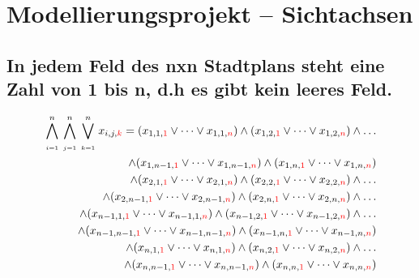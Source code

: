 \documentclass[11pt, a4paper]{article}
\begin{document}
	
	\setlength{\arrayrulewidth}{1pt} %
	
	\section{Modellierungsprojekt – Sichtachsen}
	\subsection{In jedem Feld des nxn Stadtplans steht eine Zahl von 1 bis n, d.h es gibt kein leeres Feld.}
	\begin{align*}
		\bigwedge_{\atop i=1}^n \bigwedge_{\atop j=1}^n \bigvee_{\atop k=1}^n
		x_{i,j,{\color{red}k}} = (x_{1,1,{\color{red} 1}} \vee \dots \vee x_{1,1,{\color{red} n}}) 
		\wedge (x_{1,2,{\color{red} 1}} \vee \dots \vee x_{1,2,{\color{red} n}})
		\wedge \dots \\
		\wedge (x_{1,n-1,{\color{red} 1}} \vee \dots \vee x_{1,n-1,{\color{red} n}})
		\wedge (x_{1,n,{\color{red} 1}} \vee \dots \vee x_{1,n,{\color{red} n}}) \\
		\wedge (x_{2,1,{\color{red} 1}} \vee \dots \vee x_{2,1,{\color{red} n}})
		\wedge (x_{2,2,{\color{red} 1}} \vee \dots \vee x_{2,2,{\color{red} n}})
		\wedge \dots \\
		\wedge (x_{2,n-1,{\color{red} 1}} \vee \dots \vee x_{2,n-1,{\color{red} n}})
		\wedge (x_{2,n,{\color{red} 1}} \vee \dots \vee x_{2,n,{\color{red} n}})
		\wedge \dots \\
		\wedge (x_{n-1,1,{\color{red} 1}} \vee \dots \vee x_{n-1,1,{\color{red} n}}) 
		\wedge (x_{n-1,2,{\color{red} 1}} \vee \dots \vee x_{n-1,2,{\color{red} n}})
		\wedge \dots \\
		\wedge (x_{n-1,n-1,{\color{red} 1}} \vee \dots \vee x_{n-1,n-1,{\color{red} n}})
		\wedge (x_{n-1,n,{\color{red} 1}} \vee \dots \vee x_{n-1,n,{\color{red} n}}) \\
		\wedge (x_{n,1,{\color{red} 1}} \vee \dots \vee x_{n,1,{\color{red} n}}) 
		\wedge (x_{n,2,{\color{red} 1}} \vee \dots \vee x_{n,2,{\color{red} n}})
		\wedge \dots \\
		\wedge (x_{n,n-1,{\color{red} 1}} \vee \dots \vee x_{n,n-1,{\color{red} n}})
		\wedge (x_{n,n,{\color{red} 1}} \vee \dots \vee x_{n,n,{\color{red} n}})
	\end{align*}
	\bigskip
		
\end{document}
